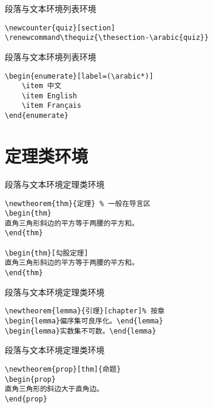 \documentclass[11pt]{beamer}
\begin{document}
\begin{frame}[fragile]{段落与文本环境}{列表环境}
	\begin{Verbatim}[tabsize=2]
\newcounter{quiz}[section]
\renewcommand\thequiz{\thesection-\arabic{quiz}}
	\end{Verbatim}
\end{frame}

\begin{frame}[fragile]{段落与文本环境}{列表环境}
	\begin{Verbatim}[tabsize=2]
% \usepackage{enumitem}
\begin{enumerate}[label=(\arabic*)]
	\item 中文
	\item English
	\item Français
\end{enumerate}
	\end{Verbatim}
\end{frame}

\section{定理类环境}

\begin{frame}[fragile]{段落与文本环境}{定理类环境}
	\begin{Verbatim}[tabsize=2]
\newtheorem{thm}{定理} % 一般在导言区
\begin{thm}
直角三角形斜边的平方等于两腰的平方和。
\end{thm}

\begin{thm}[勾股定理]
直角三角形斜边的平方等于两腰的平方和。
\end{thm}
	\end{Verbatim}
\end{frame}

\begin{frame}[fragile]{段落与文本环境}{定理类环境}
	\begin{Verbatim}[tabsize=2]
\newtheorem{lemma}{引理}[chapter]% 按章
\begin{lemma}偏序集可良序化。\end{lemma}
\begin{lemma}实数集不可数。\end{lemma}
	\end{Verbatim}
\end{frame}

\begin{frame}[fragile]{段落与文本环境}{定理类环境}
	\begin{Verbatim}[tabsize=2]
\newtheorem{prop}[thm]{命题}
\begin{prop}
直角三角形的斜边大于直角边。
\end{prop}
	\end{Verbatim}
\end{frame}
\end{document}
